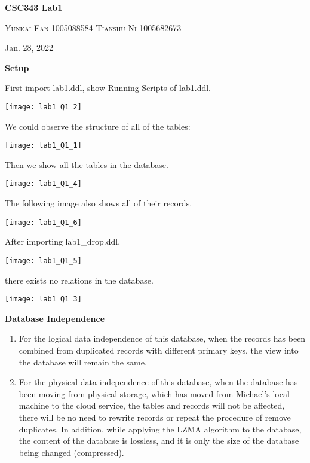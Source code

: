 \documentclass[12pt]{article}
\begin{document}
\begin{center}
\begin{Large}
  \textbf{CSC343 Lab1 }\\
\end{Large}

\begin{center}
  \textsc{Yunkai Fan 1005088584 \vskip5pt}  
  \textsc{Tianshu Ni 1005682673\vskip5pt} 
\end{center}

\begin{center}
	Jan. 28, 2022
\end{center} 
\date{28 Jan 2022}
\end{center}

\begin{center}\textbf{Setup}\\\end{center}
First import lab1.ddl, show Running Scripts of lab1.ddl. 
\begin{center}\texttt{[image: lab1\_Q1\_2]}\end{center}
We could observe the structure of all of the tables: 
\begin{center}\texttt{[image: lab1\_Q1\_1]}\end{center}

Then we show all the tables in the database.
\begin{center}\texttt{[image: lab1\_Q1\_4]}\end{center}
The following image also shows all of their records.
\begin{center}\texttt{[image: lab1\_Q1\_6]}\end{center}
After importing lab1\_drop.ddl, 
\begin{center}\texttt{[image: lab1\_Q1\_5]}\end{center}
there exists no relations in the database.
\begin{center}\texttt{[image: lab1\_Q1\_3]}\end{center}

\newpage
\begin{center}\textbf{Database Independence}\\\end{center} 
\begin{enumerate}
    \item For the logical data independence of this database, when the records has been combined from duplicated records with different primary keys, the view into the database will remain the same.
    
    \item For the physical data independence of this database, when the database has been moving from physical storage, which has moved from Michael's local machine to the cloud service, the tables and records will not be affected, there will be no need to rewrite records or repeat the procedure of remove duplicates. In addition, while applying the LZMA algorithm to the database, the content of the database is lossless, and it is only the size of the database being changed (compressed).
\end{enumerate}  
\end{document}
